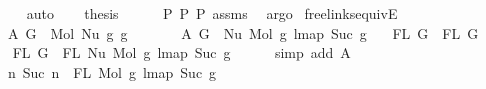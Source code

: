 \begin{isabellebody}
\ \ \ \ \isamarkupfalse%
\ auto\isanewline
\ \ \isamarkupfalse%
\ {\isacharquery}{\kern0pt}thesis\isanewline
\ \ \ \ \isamarkupfalse%
\ P{}\ P{}\ P{}\ assms{\isacharparenleft}{\kern0pt}{}{\isacharcomma}{\kern0pt}{}{\isacharparenright}{\kern0pt}\ \isamarkupfalse%
\ argo\isanewline
{}\isamarkupfalse%
%
\endisatagproof
{\isafoldproof}%
%
\isadelimproof
\isanewline
%
\endisadelimproof
\isanewline
\isanewline
\isanewline
{}\isamarkupfalse%
\ freelinks{\isacharunderscore}{\kern0pt}equiv{\isacharunderscore}{\kern0pt}E{}{}{\isacharcolon}{\kern0pt}\isanewline
\ \ \ A{}{\isacharcolon}{\kern0pt}\ {\isachardoublequoteopen}G{}\ {\isacharequal}{\kern0pt}\ Mol\ {\isacharparenleft}{\kern0pt}Nu\ g{}{\isacharparenright}{\kern0pt}\ g{}{\isachardoublequoteclose}\isanewline
\ \ \ \ \ \ \ A{}{\isacharcolon}{\kern0pt}\ {\isachardoublequoteopen}G{}\ {\isacharequal}{\kern0pt}\ Nu\ {\isacharparenleft}{\kern0pt}Mol\ g{}\ {\isacharparenleft}{\kern0pt}lmap\ Suc\ g{}{\isacharparenright}{\kern0pt}{\isacharparenright}{\kern0pt}{\isachardoublequoteclose}\isanewline
\ \ \ {\isachardoublequoteopen}FL\ G{}\ {\isacharequal}{\kern0pt}\ FL\ G{}{\isachardoublequoteclose}\isanewline
%
\isadelimproof
%
\endisadelimproof
%
\isatagproof
{}\isamarkupfalse%
\ {\isacharminus}{\kern0pt}\isanewline
\ \ \isamarkupfalse%
\ {\isachardoublequoteopen}FL\ G{}\ {\isacharequal}{\kern0pt}\ FL\ {\isacharparenleft}{\kern0pt}Nu\ {\isacharparenleft}{\kern0pt}Mol\ g{}\ {\isacharparenleft}{\kern0pt}lmap\ Suc\ g{}{\isacharparenright}{\kern0pt}{\isacharparenright}{\kern0pt}{\isacharparenright}{\kern0pt}{\isachardoublequoteclose}\isanewline
\ \ \ \ \isamarkupfalse%
\ {\isacharparenleft}{\kern0pt}simp\ add{\isacharcolon}{\kern0pt}\ A{}{\isacharparenright}{\kern0pt}\isanewline
\ \ \isamarkupfalse%
\ \isamarkupfalse%
\ {\isachardoublequoteopen}{\isachardot}{\kern0pt}{\isachardot}{\kern0pt}{\isachardot}{\kern0pt}\ {\isacharequal}{\kern0pt}\ {\isacharbraceleft}{\kern0pt}n{\isachardot}{\kern0pt}\ Suc\ n\ {\isasymin}\ FL\ {\isacharparenleft}{\kern0pt}Mol\ g{}\ {\isacharparenleft}{\kern0pt}lmap\ Suc\ g{}{\isacharparenright}{\kern0pt}{\isacharparenright}{\kern0pt}{\isacharbraceright}{\kern0pt}{\isachardoublequoteclose}\isanewline

\end{isabellebody}
